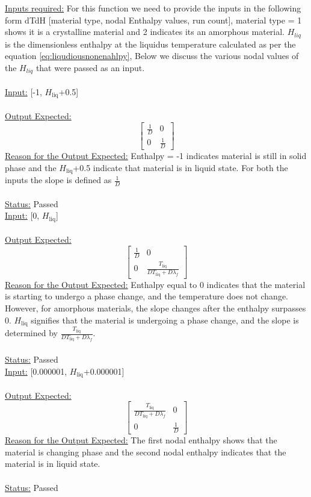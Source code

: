 \noindent \underline{Inputs required:} For this function we need to provide the inputs in the following form dT\textunderscore dH [material type, nodal Enthalpy values, run count], material type = 1 shows it is a crystalline material and 2 indicates its an amorphous material. $H_{liq}$ is the dimensionless enthalpy at the liquidus temperature calculated as per the equation \ref{eq:liqudiousnonenahlpy},  Below we discuss the various nodal values of the $H_{liq}$ that were passed as an input.\\ \\
\underline{Input:} [-1, $H_{\text{liq}}$+0.5]\\ \\
\underline{Output Expected:}
\[
\begin{bmatrix}
\frac{1}{D} & 0 \\
0 & \frac{1}{D}
\end{bmatrix}
\]
\underline{Reason for the Output Expected:} Enthalpy = -1 indicates material is still in solid phase and the $H_{\text{liq}}$+0.5 indicate that material is in liquid state. For both the inputs the slope is defined as $\frac{1}{D}$\\ \\
\underline{Status:} Passed\\

\noindent \underline{Input:} [0, $H_{\text{liq}}$]\\ \\
\underline{Output Expected:}
\[
\begin{bmatrix}
\frac{1}{D} & 0 \\
0 & \frac{T_{\text{liq}}}{D T_{\text{liq}} + D \lambda_{f}}
\end{bmatrix}
\]
\underline{Reason for the Output Expected:} Enthalpy equal to 0 indicates that the material is starting to undergo a phase change, and the temperature does not change. However, for amorphous materials, the slope changes after the enthalpy surpasses 0. $H_{\text{liq}}$ signifies that the material is undergoing a phase change, and the slope is determined by $\frac{T_{\text{liq}}}{D T_{\text{liq}} + D \lambda_{f}}$.\\ \\
\underline{Status:} Passed\\

\noindent \underline{Input:} [0.000001, $H_{\text{liq}}$+0.000001]\\ \\
\underline{Output Expected:}
\[
\begin{bmatrix}
\frac{T_{\text{liq}}}{D T_{\text{liq}} + D \lambda_{f}} & 0 \\
0 & \frac{1}{D}
\end{bmatrix}
\]
\underline{Reason for the Output Expected:} The first nodal enthalpy shows that the material is changing phase and the second nodal enthalpy indicates that the material is in liquid state.\\ \\
\underline{Status:} Passed\\

